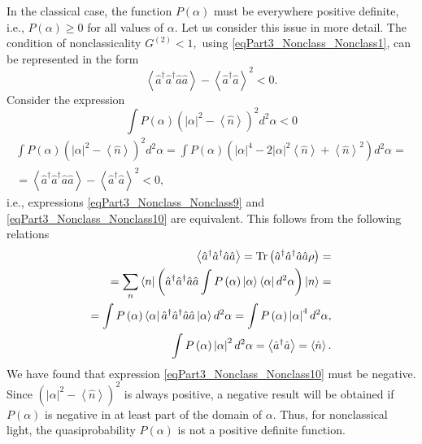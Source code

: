 In the classical case, the function $P\left(\alpha\right)$ must be everywhere
positive definite, i.e., $P\left(\alpha\right) \ge 0$ for all
values of $\alpha$. Let us consider this issue in more detail. The condition
of nonclassicality 
\(
G^{(2)} < 1,
\)
using \eqref{eqPart3_Nonclass_Nonclass1}, can be represented in the form
\begin{equation}
\left<\hat{a}^{\dag}\hat{a}^{\dag}\hat{a}\hat{a}\right> -
\left<\hat{a}^{\dag}\hat{a}\right>^2 < 0.
\label{eqPart3_Nonclass_Nonclass9}
\end{equation}
Consider the expression
\begin{equation}
\int P\left(\alpha\right)\left(\left|\alpha\right|^2 -
\left<\hat{n}\right>\right)^2 d^2\alpha < 0
\label{eqPart3_Nonclass_Nonclass10}
\end{equation}
\begin{eqnarray}
\int P\left(\alpha\right)\left(\left|\alpha\right|^2 -
\left<\hat{n}\right>\right)^2 d^2\alpha = 
\int P\left(\alpha\right)\left(\left|\alpha\right|^4 -
2\left|\alpha\right|^2 \left<\hat{n}\right> +
\left<\hat{n}\right>^2\right) d^2\alpha = 
\nonumber \\
=
\left<\hat{a}^{\dag}\hat{a}^{\dag}\hat{a}\hat{a}\right> -
\left<\hat{a}^{\dag}\hat{a}\right>^2 < 0,
\nonumber
\end{eqnarray}
i.e., expressions \eqref{eqPart3_Nonclass_Nonclass9} and
\eqref{eqPart3_Nonclass_Nonclass10} are equivalent. This follows from
the following relations
\begin{eqnarray}
  \left<\hat{a}^{\dag}\hat{a}^{\dag}\hat{a}\hat{a}\right> = \mathrm{Tr} \left(
  \hat{a}^{\dag}\hat{a}^{\dag}\hat{a}\hat{a} \rho \right)=
  \nonumber \\
  =
  \sum_n \bra{n}\left(\hat{a}^{\dag}\hat{a}^{\dag}\hat{a}\hat{a}
  \int P\left(\alpha\right)
  \left|\alpha\right>\left<\alpha\right| d^2\alpha
  \right)
  \ket{n} =
  \nonumber \\
  =
  \int P\left(\alpha\right)
  \left<\alpha\right|\hat{a}^{\dag}\hat{a}^{\dag}\hat{a}\hat{a}\left|\alpha\right>
  d^2\alpha = 
\int P\left(\alpha\right)\left|\alpha\right|^4 d^2\alpha,
\nonumber \\
\int P\left(\alpha\right)\left|\alpha\right|^2 d^2\alpha = 
\left<\hat{a}^{\dag}\hat{a}\right> = \left<\hat{n}\right>.
\nonumber
\end{eqnarray}
We have found that expression \eqref{eqPart3_Nonclass_Nonclass10} must
be negative. Since 
\(
\left(\left|\alpha\right|^2 -
\left<\hat{n}\right>\right)^2
\)
is always positive, a negative result will be obtained if 
$P\left(\alpha\right)$ is negative in at least part of the domain of $\alpha$.
Thus, for nonclassical light,
the quasiprobability $P\left(\alpha\right)$ is not a positive
definite function.